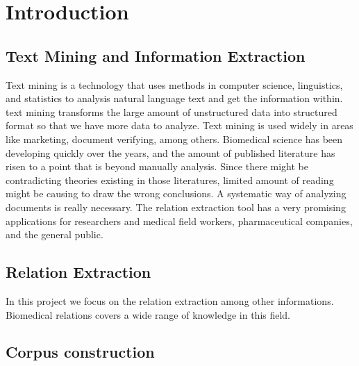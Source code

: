\chapter{Introduction}  %

\ifpdf
    \graphicspath{{Introduction/Figs/Raster/}{Introduction/Figs/PDF/}{Introduction/Figs/}}
\else
    \graphicspath{{Introduction/Figs/Vector/}{Introduction/Figs/}}
\fi


\section{Text Mining and Information Extraction} %


Text mining is a technology that uses methods in computer science, linguistics, and statistics to analysis natural language text and get the information within.  text mining transforms the large amount of unstructured data into structured format so that we have more data to analyze. Text mining is used widely in areas like marketing, document verifying, among others. Biomedical science has been developing quickly over the years, and the amount of published literature has risen to a point that is beyond manually analysis. Since there might be contradicting theories existing in those literatures, 	limited amount of reading might be causing to draw the wrong conclusions. A systematic way of analyzing documents is really necessary. The relation extraction tool has a very promising applications for researchers and medical field workers, pharmaceutical companies, 	and the general public.




\section{Relation Extraction} %
In this project we focus on the relation extraction among other informations. Biomedical relations covers a wide range of knowledge in this field.

\section{Corpus construction}  %
\label{section1.3}


